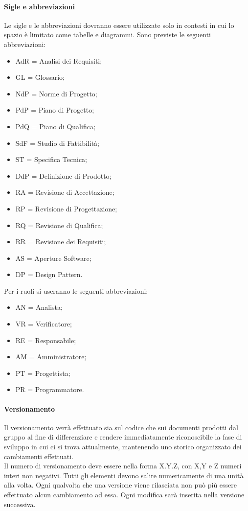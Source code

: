 \paragraph{Sigle e abbreviazioni}
\label{5.5}
Le sigle e le abbreviazioni dovranno essere utilizzate solo in contesti in cui lo spazio è limitato come tabelle e diagrammi. Sono previste le seguenti abbreviazioni:
\begin{itemize}
\item AdR = Analisi dei Requisiti;
\item GL = Glossario;
\item NdP = Norme di Progetto;
\item PdP = Piano di Progetto;
\item PdQ = Piano di Qualifica;
\item SdF = Studio di Fattibilità;
\item ST = Specifica Tecnica;
\item DdP = Definizione di Prodotto;
\item RA = Revisione di Accettazione;
\item RP = Revisione di Progettazione;
\item RQ = Revisione di Qualifica;
\item RR = Revisione dei Requisiti;
\item AS = Aperture Software;
\item DP = Design Pattern.
\end{itemize}
Per i ruoli si useranno le seguenti abbreviazioni:
\begin{itemize}
\item AN = Analista;
\item VR = Verificatore;
\item RE = Responsabile;
\item AM = Amministratore;
\item PT = Progettista;
\item PR = Programmatore.
\end{itemize}


\newpage
\paragraph{Versionamento}
\label{6.0}
Il versionamento verrà effettuato sia sul codice che sui documenti prodotti dal gruppo al fine di differenziare e rendere immediatamente riconoscibile la fase di sviluppo in cui ci si trova attualmente, mantenendo uno storico organizzato dei cambiamenti effettuati.\\
Il numero di versionamento deve essere nella forma X.Y.Z, con X,Y e Z numeri interi non negativi. Tutti gli elementi devono salire numericamente di una unità alla volta.
Ogni qualvolta che una versione viene rilasciata non può più essere effettuato alcun cambiamento ad essa. Ogni modifica sarà inserita nella versione successiva.


